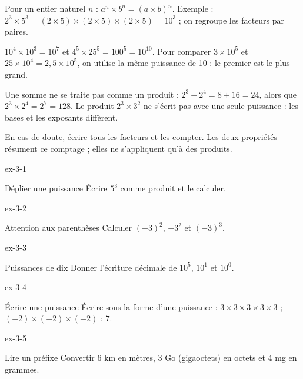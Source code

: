 \begin{propriete}Pour un entier naturel $n$ : $a^n\times b^n=(a\times b)^n$. Exemple : $2^3\times5^3=(2\times5)\times(2\times5)\times(2\times5)=10^3$ ; on regroupe les facteurs par paires.\end{propriete}
\begin{exemple}$10^4\times10^3=10^7$ et $4^5\times25^5=100^5=10^{10}$. Pour comparer $3\times10^5$ et $25\times10^4=2{,}5\times10^5$, on utilise la même puissance de 10 : le premier est le plus grand.\end{exemple}
\begin{attention}Une somme ne se traite pas comme un produit : $2^3+2^4=8+16=24$, alors que $2^3\times2^4=2^7=128$. Le produit $2^3\times3^2$ ne s’écrit pas avec une seule puissance : les bases et les exposants diffèrent.\end{attention}
\begin{savoirfaire}En cas de doute, écrire tous les facteurs et les compter. Les deux propriétés résument ce comptage ; elles ne s’appliquent qu’à des produits.\end{savoirfaire}

\clearpage{}
\begin{blocLivre}{ex-3-1}\begin{exercice}[1]{Déplier une puissance}
Écrire $5^3$ comme produit et le calculer.
\end{exercice}\end{blocLivre}
\begin{blocLivre}{ex-3-2}\begin{exercice}[1]{Attention aux parenthèses}
Calculer $(-3)^2$, $-3^2$ et $(-3)^3$.
\end{exercice}\end{blocLivre}
\begin{blocLivre}{ex-3-3}\begin{exercice}[1]{Puissances de dix}
Donner l’écriture décimale de $10^5$, $10^1$ et $10^0$.
\end{exercice}\end{blocLivre}
\begin{blocLivre}{ex-3-4}\begin{exercice}[1]{Écrire une puissance}
Écrire sous la forme d’une puissance : $3\times3\times3\times3\times3$ ; $(-2)\times(-2)\times(-2)$ ; $7$.
\end{exercice}\end{blocLivre}
\begin{blocLivre}{ex-3-5}\begin{exercice}[1]{Lire un préfixe}
Convertir 6 km en mètres, 3 Go (gigaoctets) en octets et 4 mg en grammes.
\end{exercice}\end{blocLivre}

